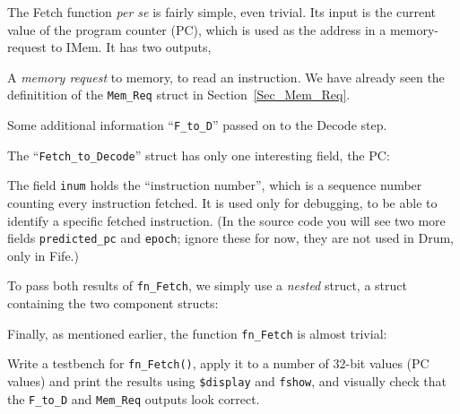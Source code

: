 The Fetch function \emph{per se} is fairly simple, even trivial.  Its
input is the current value of the program counter (PC), which is used
as the address in a memory-request to IMem.  It has two outputs,

\begin{tightlist}

 \item A \emph{memory request} to memory, to read an instruction.  We
       have already seen the definitition of the \verb|Mem_Req| struct
       in Section~\ref{Sec_Mem_Req}.

 \item Some additional information ``\verb|F_to_D|'' passed on to the
       Decode step.

\end{tightlist}

The ``\verb|Fetch_to_Decode|'' struct has only one interesting field,
the PC:



The field \verb|inum| holds the ``instruction number'', which is a
sequence number counting every instruction fetched.  It is used only
for debugging, to be able to identify a specific fetched instruction.
(In the source code you will see two more fields \verb|predicted_pc|
and \verb|epoch|; ignore these for now, they are not used in Drum,
only in Fife.)


To pass both results of \verb|fn_Fetch|, we simply use a \emph{nested}
struct, {\ie} a struct containing the two component structs:



Finally, as mentioned earlier, the function \verb|fn_Fetch| is almost
trivial:




\hdivider

\Exercise

Write a testbench for \verb|fn_Fetch()|, apply it to a number of
32-bit values (PC values) and print the results using \verb|$display|
and \verb|fshow|, and visually check that the \verb|F_to_D| and
\verb|Mem_Req| outputs look correct.

\Endexercise


